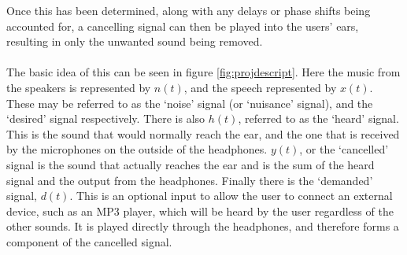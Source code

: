 Once this has been determined, along with any delays or phase shifts being accounted for, a cancelling signal can then be played into the users' ears, resulting in only the unwanted sound being removed.
\\
\\
The basic idea of this can be seen in figure \ref{fig:projdescript}.
Here the music from the speakers is represented by $n(t)$, and the speech represented by $x(t)$.
These may be referred to as the `noise' signal (or `nuisance' signal), and the `desired' signal respectively.
There is also $h(t)$, referred to as the `heard' signal.
This is the sound that would normally reach the ear, and the one that is received by the microphones on the outside of the headphones.
$y(t)$, or the `cancelled' signal is the sound that actually reaches the ear and is the sum of the heard signal and the output from the headphones.
Finally there is the `demanded' signal, $d(t)$.
This is an optional input to allow the user to connect an external device, such as an MP3 player, which will be heard by the user regardless of the other sounds.
It is played directly through the headphones, and therefore forms a component of the cancelled signal. 

